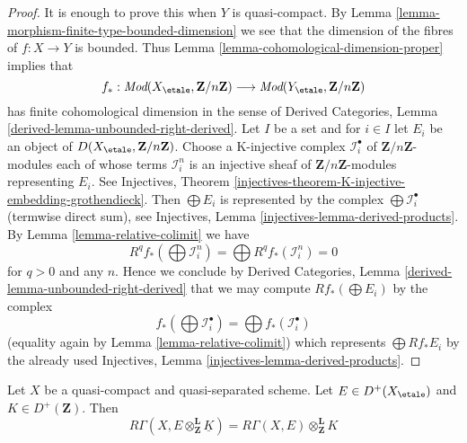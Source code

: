 \begin{proof}
It is enough to prove this when $Y$ is quasi-compact.
By Lemma \ref{lemma-morphism-finite-type-bounded-dimension}
we see that the dimension of the fibres of
$f : X \to Y$ is bounded.
Thus Lemma \ref{lemma-cohomological-dimension-proper} implies that
$$
f_* :
\textit{Mod}(X_\etale, \mathbf{Z}/n\mathbf{Z})
\longrightarrow
\textit{Mod}(Y_\etale, \mathbf{Z}/n\mathbf{Z})
$$
has finite cohomological dimension in the sense of
Derived Categories, Lemma \ref{derived-lemma-unbounded-right-derived}.
Let $I$ be a set and for $i \in I$ let $E_i$ be
an object of $D(X_\etale, \mathbf{Z}/n\mathbf{Z})$.
Choose a K-injective complex $\mathcal{I}_i^\bullet$
of $\mathbf{Z}/n\mathbf{Z}$-modules each of whose
terms $\mathcal{I}_i^n$ is an injective sheaf of
$\mathbf{Z}/n\mathbf{Z}$-modules representing $E_i$.
See Injectives, Theorem
\ref{injectives-theorem-K-injective-embedding-grothendieck}.
Then $\bigoplus E_i$ is represented by the complex
$\bigoplus \mathcal{I}_i^\bullet$ (termwise direct sum), see
Injectives, Lemma \ref{injectives-lemma-derived-products}.
By Lemma \ref{lemma-relative-colimit} we have
$$
R^qf_*(\bigoplus \mathcal{I}_i^n) =
\bigoplus R^qf_*(\mathcal{I}_i^n) = 0
$$
for $q > 0$ and any $n$. Hence we conclude by 
Derived Categories, Lemma \ref{derived-lemma-unbounded-right-derived}
that we may compute $Rf_*(\bigoplus E_i)$ by the complex
$$
f_*(\bigoplus \mathcal{I}_i^\bullet) =
\bigoplus f_*(\mathcal{I}_i^\bullet)
$$
(equality again by Lemma \ref{lemma-relative-colimit}) which
represents $\bigoplus Rf_*E_i$ by the already used
Injectives, Lemma \ref{injectives-lemma-derived-products}.
\end{proof}

\begin{lemma}
\label{lemma-pull-out-constant}
Let $X$ be a quasi-compact and quasi-separated scheme.
Let $E \in D^+(X_\etale)$ and $K \in D^+(\mathbf{Z})$.
Then
$$
R\Gamma(X, E \otimes_\mathbf{Z}^\mathbf{L} \underline{K}) =
R\Gamma(X, E) \otimes_\mathbf{Z}^\mathbf{L} K
$$
\end{lemma}

